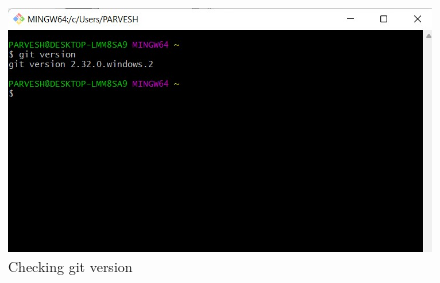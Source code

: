 \documentclass[12pt]{article}
\begin{document}
\begin{figure}[H]
\centering
\includegraphics[scale=1]{gitversion}
\caption{Checking git version}
\label{gitversion}
\vspace{0.6\baselineskip}
\end{figure}
\end{document}
